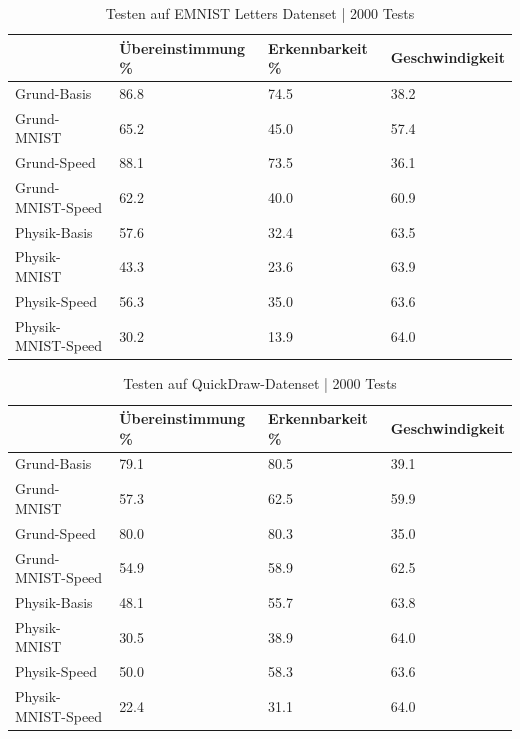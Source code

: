 \begin{table}[!ht]
    \centering
    \caption{Testen auf EMNIST Letters Datenset | 2000 Tests}
    \begin{tabular}{|l|l|l|l|}
    \hline
        ~ & Übereinstimmung \% & Erkennbarkeit \% & Geschwindigkeit \\ \hline
        Grund-Basis & 86.8 & 74.5 & 38.2 \\ \hline
        Grund-MNIST & 65.2 & 45.0 & 57.4 \\ \hline
        Grund-Speed & 88.1 & 73.5 & 36.1 \\ \hline
        Grund-MNIST-Speed & 62.2 & 40.0 & 60.9 \\ \hline
        Physik-Basis & 57.6 & 32.4 & 63.5 \\ \hline
        Physik-MNIST & 43.3 & 23.6 & 63.9 \\ \hline
        Physik-Speed & 56.3 & 35.0 & 63.6 \\ \hline
        Physik-MNIST-Speed & 30.2 & 13.9 & 64.0 \\ \hline
    \end{tabular}
    \label{tab:EMNIST}
\end{table}

\begin{table}[!ht]
    \centering
    \caption{Testen auf QuickDraw-Datenset | 2000 Tests}
    \begin{tabular}{|l|l|l|l|}
    \hline
        ~ & Übereinstimmung \% & Erkennbarkeit \% & Geschwindigkeit \\ \hline
        Grund-Basis & 79.1 & 80.5 & 39.1 \\ \hline
        Grund-MNIST & 57.3 & 62.5 & 59.9 \\ \hline
        Grund-Speed & 80.0 & 80.3 & 35.0 \\ \hline
        Grund-MNIST-Speed & 54.9 & 58.9 & 62.5 \\ \hline
        Physik-Basis & 48.1 & 55.7 & 63.8 \\ \hline
        Physik-MNIST & 30.5 & 38.9 & 64.0 \\ \hline
        Physik-Speed & 50.0 & 58.3 & 63.6 \\ \hline
        Physik-MNIST-Speed & 22.4 & 31.1 & 64.0 \\ \hline
    \end{tabular}
    \label{tab:Quickdraw}
\end{table}

\newpage

